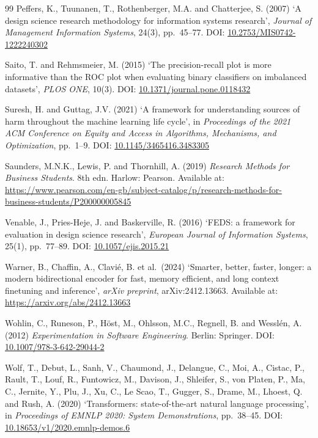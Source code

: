 \documentclass[12pt,a4paper]{article}
\begin{document}
\begin{thebibliography}{99}
Peffers, K., Tuunanen, T., Rothenberger, M.A. and Chatterjee, S. (2007)
`A design science research methodology for information systems research',
\textit{Journal of Management Information Systems}, 24(3), pp.~45--77.
DOI: \href{https://doi.org/10.2753/MIS0742-1222240302}{10.2753/MIS0742-1222240302}


Saito, T. and Rehmsmeier, M. (2015)
`The precision-recall plot is more informative than the ROC plot when evaluating
binary classifiers on imbalanced datasets',
\textit{PLOS ONE}, 10(3).
DOI: \href{https://doi.org/10.1371/journal.pone.0118432}{10.1371/journal.pone.0118432}

Suresh, H. and Guttag, J.V. (2021)
`A framework for understanding sources of harm throughout the machine learning
life cycle',
in \textit{Proceedings of the 2021 ACM Conference on Equity and Access in
Algorithms, Mechanisms, and Optimization}, pp.~1--9.
DOI: \href{https://doi.org/10.1145/3465416.3483305}{10.1145/3465416.3483305}

Saunders, M.N.K., Lewis, P. and Thornhill, A. (2019)
\textit{Research Methods for Business Students}. 8th edn. Harlow: Pearson.
Available at: \url{https://www.pearson.com/en-gb/subject-catalog/p/research-methods-for-business-students/P200000005845}

Venable, J., Pries-Heje, J. and Baskerville, R. (2016)
`FEDS: a framework for evaluation in design science research',
\textit{European Journal of Information Systems}, 25(1), pp.~77--89.
DOI: \href{https://doi.org/10.1057/ejis.2015.21}{10.1057/ejis.2015.21}

Warner, B., Chaffin, A., Clavi\'{e}, B. et al.\ (2024)
`Smarter, better, faster, longer: a modern bidirectional encoder for fast,
memory efficient, and long context finetuning and inference',
\textit{arXiv preprint}, arXiv:2412.13663.
Available at: \url{https://arxiv.org/abs/2412.13663}

Wohlin, C., Runeson, P., H\"{o}st, M., Ohlsson, M.C., Regnell, B.
and Wessl\'{e}n, A. (2012)
\textit{Experimentation in Software Engineering}. Berlin: Springer.
DOI: \href{https://doi.org/10.1007/978-3-642-29044-2}{10.1007/978-3-642-29044-2}


Wolf, T., Debut, L., Sanh, V., Chaumond, J., Delangue, C., Moi, A.,
Cistac, P., Rault, T., Louf, R., Funtowicz, M., Davison, J., Shleifer, S.,
von Platen, P., Ma, C., Jernite, Y., Plu, J., Xu, C., Le Scao, T.,
Gugger, S., Drame, M., Lhoest, Q. and Rush, A. (2020)
`Transformers: state-of-the-art natural language processing',
in \textit{Proceedings of EMNLP 2020: System Demonstrations}, pp.~38--45.
DOI: \href{https://doi.org/10.18653/v1/2020.emnlp-demos.6}{10.18653/v1/2020.emnlp-demos.6}


\end{thebibliography}
\end{document}
